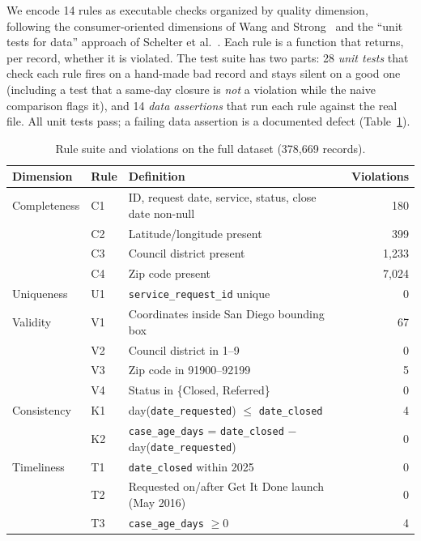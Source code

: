 \documentclass[11pt]{article}
\begin{document}
We encode 14 rules as executable checks organized by quality dimension, following the consumer-oriented dimensions of Wang and Strong~\cite{wang1996beyond} and the ``unit tests for data'' approach of Schelter et al.~\cite{schelter2018dq}. Each rule is a function that returns, per record, whether it is violated. The test suite has two parts: 28 \emph{unit tests} that check each rule fires on a hand-made bad record and stays silent on a good one (including a test that a same-day closure is \emph{not} a violation while the naive comparison flags it), and 14 \emph{data assertions} that run each rule against the real file. All unit tests pass; a failing data assertion is a documented defect (Table~\ref{tab:rules}).

\begin{table}[tbp]
\centering\small
\caption{Rule suite and violations on the full dataset (378,669 records).}
\label{tab:rules}
\begin{tabularx}{\linewidth}{@{}llXr@{}}
\toprule
Dimension & Rule & Definition & Violations \\
\midrule
Completeness & C1 & ID, request date, service, status, close date non-null & 180 \\
             & C2 & Latitude/longitude present & 399 \\
             & C3 & Council district present & 1,233 \\
             & C4 & Zip code present & 7,024 \\
Uniqueness   & U1 & \texttt{service\_request\_id} unique & 0 \\
Validity     & V1 & Coordinates inside San Diego bounding box & 67 \\
             & V2 & Council district in 1--9 & 0 \\
             & V3 & Zip code in 91900--92199 & 5 \\
             & V4 & Status in \{Closed, Referred\} & 0 \\
Consistency  & K1 & day(\texttt{date\_requested}) $\le$ \texttt{date\_closed} & 4 \\
             & K2 & \texttt{case\_age\_days} = \texttt{date\_closed} $-$ day(\texttt{date\_requested}) & 0 \\
Timeliness   & T1 & \texttt{date\_closed} within 2025 & 0 \\
             & T2 & Requested on/after Get It Done launch (May 2016) & 0 \\
             & T3 & \texttt{case\_age\_days} $\ge 0$ & 4 \\
\bottomrule
\end{tabularx}
\end{table}
\end{document}
